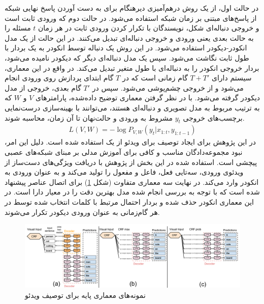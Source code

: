 در حالت اول، از یک روش درهم‌آمیزی دیرهنگام برای به دست آوردن پاسخ نهایی شبکه از پاسخ‌های مبتنی بر زمان شبکه استفاده می‌شود.  در حالت دوم که ورودی ثابت است و خروجی دنباله‌ای شکل، نویسندگان با تکرار کردن ورودی ثابت در هر زمان $t$ مسئله را به حالت بعدی یعنی ورودی و خروجی دنباله‌ای تبدیل می‌کنند. در این حالت از یک مدل انکودر-دیکودر 
استفاده می‌شود. در این روش یک دنباله توسط انکودر به یک بردار با طول ثابت نگاشت می‌شود. سپس یک مدل دنباله‌ای دیگر که دیکودر نامیده می‌شود، بردار خروجی انکودر را به دنباله‌ای با طول متغیر تبدیل می‌کند. در واقع در این معماری، سیستم دارای $T+T'$ گام زمانی است که در $T$ گام ابتدای پردازش روی ورودی انجام می‌شود و از خروجی چشم‌پوشی می‌شود. سپس در $T'$ گام بعدی، خروجی از مدل دیکودر گرفته می‌شود.
با در نظر گرفتن معماری توضیح داده‌شده، پارامتر‌های $V$ و $W$ که به ترتیب مربوط به مدل تصویری و دنباله‌ای هستند، می‌توانند با بهینه‌سازی درست‌نمایی برچسب‌های خروجی $y_t$ مشروط به ورودی و حالت‌نهان تا آن زمان، محاسبه شوند.
\begin{align*}
L(V, W) = -\log P_{V,W}(y_t‌|‌x_{1:t}, y_{1:t-1})
\end{align*}
در این پژوهش برای ایجاد توصیف برای ویدئو از یک
 
استفاده شده است. دلیل این امر، نبود مجموعه‌دادگان مناسب و کافی برای آموزش مدلی بر مبنای شبکه‌های عصبی پیچشی است.  استفاده شده در این بخش از پژوهش با دریافت ویژگی‌های دست‌ساز از ویدئو‌ی ورودی، سه‌تایی فعل، فاعل و مفعول را تولید می‌کند و به عنوان ورودی به انکودر وارد می‌کند.  در نهایت سه معماری متفاوت (شکل \ref{lrcn-captioning}) برای اتصال عناصر پیشنهاد شده‌ است که با توجه به بررسی انجام شده مدل  بهترین دقت را در معیار  دارا است. در این معماری انکودر حذف شده و بردار احتمال مرتبط با کلمات انتخاب شده توسط  در هر گام‌زمانی به عنوان ورودی دیکودر تکرار می‌شوند. 
\begin{figure}[ht!]
	\centering
	\includegraphics[width=170mm]{images/lrcn-captioning.png}
	\caption{نمونه‌های معماری پایه برای توصیف ویدئو\label{lrcn-captioning}\cite{Donahue2015}}
\end{figure}


